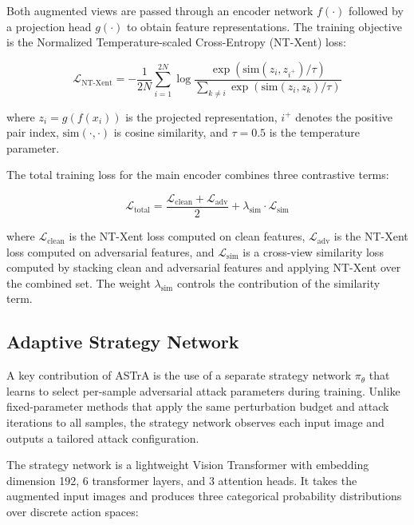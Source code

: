 \documentclass[conference]{IEEEtran}
\begin{document}
Both augmented views are passed through an encoder network $f(\cdot)$ followed by a projection head $g(\cdot)$ to obtain feature representations. The training objective is the Normalized Temperature-scaled Cross-Entropy (NT-Xent) loss:

\begin{equation}
\mathcal{L}_{\text{NT-Xent}} = -\frac{1}{2N} \sum_{i=1}^{2N} \log \frac{\exp(\text{sim}(z_i, z_{i^+}) / \tau)}{\sum_{k \neq i} \exp(\text{sim}(z_i, z_k) / \tau)}
\end{equation}

\noindent where $z_i = g(f(x_i))$ is the projected representation, $i^+$ denotes the positive pair index, $\text{sim}(\cdot, \cdot)$ is cosine similarity, and $\tau = 0.5$ is the temperature parameter.

The total training loss for the main encoder combines three contrastive terms:

\begin{equation}
\mathcal{L}_{\text{total}} = \frac{\mathcal{L}_{\text{clean}} + \mathcal{L}_{\text{adv}}}{2} + \lambda_{\text{sim}} \cdot \mathcal{L}_{\text{sim}}
\end{equation}

\noindent where $\mathcal{L}_{\text{clean}}$ is the NT-Xent loss computed on clean features, $\mathcal{L}_{\text{adv}}$ is the NT-Xent loss computed on adversarial features, and $\mathcal{L}_{\text{sim}}$ is a cross-view similarity loss computed by stacking clean and adversarial features and applying NT-Xent over the combined set. The weight $\lambda_{\text{sim}}$ controls the contribution of the similarity term.

\subsection{Adaptive Strategy Network}

A key contribution of ASTrA is the use of a separate strategy network $\pi_\theta$ that learns to select per-sample adversarial attack parameters during training. Unlike fixed-parameter methods that apply the same perturbation budget and attack iterations to all samples, the strategy network observes each input image and outputs a tailored attack configuration.

The strategy network is a lightweight Vision Transformer with embedding dimension 192, 6 transformer layers, and 3 attention heads. It takes the augmented input images and produces three categorical probability distributions over discrete action spaces:
\end{document}
